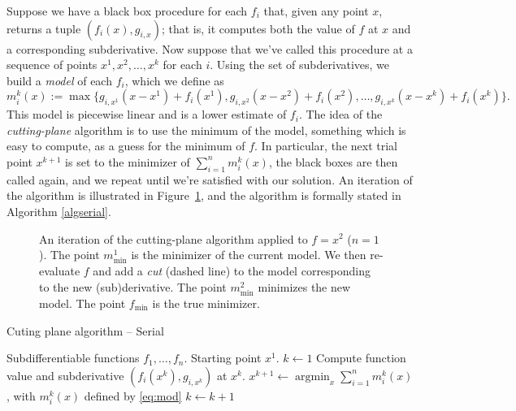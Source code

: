\documentclass[12pt]{article}
\theoremstyle{definition}
\begin{document}
Suppose we have a black box procedure for each $f_i$ that, given any point $x$, returns a tuple $(f_i(x),g_{i,x})$; that is, it computes both the value of $f$ at $x$ and a corresponding subderivative. Now suppose that we've called this procedure at a sequence of points $x^1,x^2,\ldots,x^k$ for each $i$. Using the set of subderivatives, we build a \textit{model} of each $f_i$, which we define as
\begin{equation}\label{eq:mod}
m^k_i(x) := \max\{g_{i,x^1}(x-x^1) + f_i(x^1),g_{i,x^2}(x-x^2) + f_i(x^2),\ldots,g_{i,x^k}(x-x^k) + f_i(x^k)\}.
\end{equation}
This model is piecewise linear and is a lower estimate of $f_i$. The idea of the \textit{cutting-plane} algorithm is to use the minimum of the model, something which is easy to compute, as a guess for the minimum of $f$. In particular, the next trial point $x^{k+1}$ is set to the minimizer of $\sum_{i=1}^n m_i^k(x)$, the black boxes are then called again, and we repeat until we're satisfied with our solution. An iteration of the algorithm is illustrated in Figure~\ref{fig:cut}, and the algorithm is formally stated in Algorithm \ref{algserial}.

\begin{figure}[ht]
\centering
{}
\caption{An iteration of the cutting-plane algorithm applied to $f = x^2$ ($n = 1$). The point $m_\text{min}^1$ is the minimizer of the current model. We then re-evaluate $f$ and add a \textit{cut} (dashed line) to the model corresponding to the new (sub)derivative. The point $m_\text{min}^2$ minimizes the new model. The point $f_\text{min}$ is the true minimizer.}\label{fig:cut}
\end{figure}
\begin{algorithm}
\caption{Cuting plane algorithm -- Serial}\label{algserial}
\begin{algorithmic}[1]
\REQUIRE Subdifferentiable functions $f_1,\ldots,f_n$. Starting point $x^1$.
\STATE $k \leftarrow 1$
\REPEAT
{}
\STATE Compute function value and subderivative $(f_i(x^k),g_{i,x^k})$ at $x^k$.
\ENDFOR
\STATE $x^{k+1} \leftarrow \operatorname{argmin}_x \sum_{i=1}^n m^k_i(x)$, with $m^k_i(x)$ defined by \eqref{eq:mod}
\STATE $k \leftarrow k + 1$
\end{algorithmic}
\end{algorithm}
\end{document}
